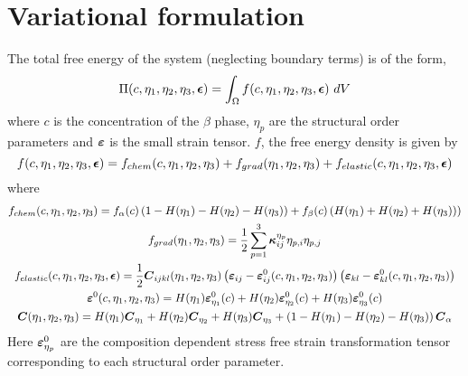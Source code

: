 \documentclass[11pt]{article}
\renewcommand{\=}[1]{\stackrel{#1}{=}} %
\theoremstyle{definition}
\theoremstyle{remark}
\def\Bepsilon{\mbox{\boldmath$\epsilon$}}
\def\Bkappa{\mbox{\boldmath$\kappa$}}
\def\Bvarepsilon{\mbox{\boldmath$\varepsilon$}}
\def\bC{\mbox{\boldmath$ C$}}
\begin{document}
\section{Variational formulation}
The total free energy of the system (neglecting boundary terms) is of the form,
\begin{equation}
\Pi(c, \eta_1, \eta_2, \eta_3, \Bepsilon) = \int_{\Omega} f(c, \eta_1, \eta_2, \eta_3, \Bepsilon) ~dV 
\end{equation}
where $c$ is the concentration of the $\beta$ phase, $\eta_p$ are the structural order parameters and $\Bvarepsilon$ is the small strain tensor. $f$, the free energy density is given by
\begin{equation}
 f(c, \eta_1, \eta_2, \eta_3, \Bepsilon) =   f_{chem}(c, \eta_1, \eta_2, \eta_3) + f_{grad}(\eta_1, \eta_2, \eta_3) + f_{elastic}(c,\eta_1, \eta_2, \eta_3,\Bepsilon)
\end{equation}
where
\begin{gather}
f_{chem}(c, \eta_1, \eta_2, \eta_3) = f_{\alpha}(c) \left( 1- H(\eta_1)-H(\eta_2)-H(\eta_3)\right) + f_{\beta}(c) \left(  H(\eta_1)  + H(\eta_2) + H(\eta_3)) \right) \\
f_{grad}(\eta_1, \eta_2, \eta_3) = \frac{1}{2} \sum_{p=1}^3 \Bkappa^{\eta_p}_{ij} \eta_{p,i}  \eta_{p,j} \\
f_{elastic}(c,\eta_1, \eta_2, \eta_3,\Bepsilon) = \frac{1}{2} \bC_{ijkl}(\eta_1, \eta_2, \eta_3)  \left( \Bvarepsilon_{ij} - \Bvarepsilon ^0_{ij}(c, \eta_1, \eta_2, \eta_3) \right)\left( \Bvarepsilon_{kl} - \Bvarepsilon^0_{kl}(c, \eta_1, \eta_2, \eta_3)\right) \\
\Bvarepsilon^0(c, \eta_1, \eta_2, \eta_3) = H(\eta_1) \Bvarepsilon^0_{\eta_1} (c)+ H(\eta_2) \Bvarepsilon^0_{\eta_2} (c) + H(\eta_3) \Bvarepsilon^0_{\eta_3} (c) \\
\bC(\eta_1, \eta_2, \eta_3) = H(\eta_1) \bC_{\eta_1}+ H(\eta_2) \bC_{\eta_2} + H(\eta_3) \bC_{\eta_3} + \left( 1- H(\eta_1)-H(\eta_2)-H(\eta_3)\right)  \bC_{\alpha}
\end{gather}
Here $\Bvarepsilon^0_{\eta_p}$ are the composition dependent stress free strain transformation tensor corresponding to each structural order parameter.
\end{document}
